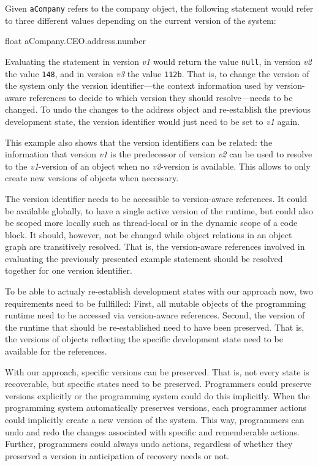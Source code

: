 Given \lstinline{aCompany} refers to the company object, the following statement would refer to three different values depending on the current version of the system:

\begin{code}{}{float}
aCompany.CEO.address.number
\end{code}
\iffalse
\end{verbatim}\fi

Evaluating the statement in version \emph{v1} would return the value \lstinline{null}, in version \emph{v2} the value \lstinline{148}, and in version \emph{v3} the value \lstinline{112b}.
That is, to change the version of the system only the version identifier---the context information used by version-aware references to decide to which version they should resolve---needs to be changed.
To undo the changes to the address object and re-establish the previous development state, the version identifier would just need to be set to \emph{v1} again.

This example also shows that the version identifiers can be related: the information that version \emph{v1} is the predecessor of version \emph{v2} can be used to resolve to the \emph{v1}-version of an object when no \emph{v2}-version is available.
This allows to only create new versions of objects when necessary.

The version identifier needs to be accessible to version-aware references.
It could be available globally, to have a single active version of the runtime, but could also be scoped more locally such as thread-local or in the dynamic scope of a code block.
It should, however, not be changed while object relations in an object graph are transitively resolved.
That is, the version-aware references involved in evaluating the previously presented example statement should be resolved together for one version identifier.

To be able to actualy re-establish development states with our approach now, two requirements need to be fullfilled:
First, all mutable objects of the programming runtime need to be accessed via version-aware references.
Second, the version of the runtime that should be re-established need to have been preserved.
That is, the versions of objects reflecting the specific development state need to be available for the references.

With our approach, specific versions can be preserved.
That is, not every state is recoverable, but specific states need to be preserved.
Programmers could preserve versions explicitly or the programming system could do this implicitly.
When the programming system automatically preserves versions, each programmer actions could implicitly create a new version of the system.
This way, programmers can undo and redo the changes associated with specific and rememberable actions.
Further, programmers could always undo actions, regardless of whether they preserved a version in anticipation of recovery needs or not.


